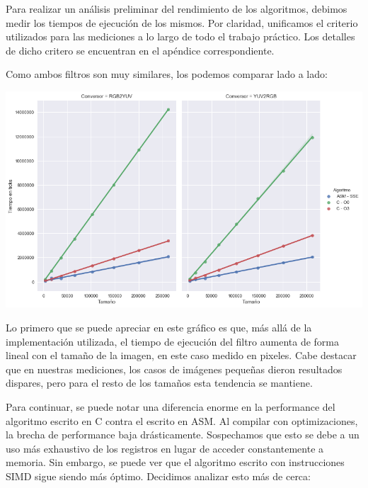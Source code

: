 Para realizar un análisis preliminar del rendimiento de los algoritmos, debimos medir los tiempos de ejecución de los mismos. Por claridad, unificamos el criterio utilizados para las mediciones a lo largo de todo el trabajo práctico. Los detalles de dicho critero se encuentran en el apéndice correspondiente.

Como ambos filtros son muy similares, los podemos comparar lado a lado:

\begin{center}
	\includegraphics[scale=0.5]{img/conversores_CvsASMvsO3.png}
\end{center}

Lo primero que se puede apreciar en este gráfico es que, más allá de la implementación utilizada, el tiempo de ejecución del filtro aumenta de forma lineal con el tamaño de la imagen, en este caso medido en pixeles. Cabe destacar que en nuestras mediciones, los casos de imágenes pequeñas dieron resultados dispares, pero para el resto de los tamaños esta tendencia se mantiene.

Para continuar, se puede notar una diferencia enorme en la performance del algoritmo escrito en C contra el escrito en ASM. Al compilar con optimizaciones, la brecha de performance baja drásticamente. Sospechamos que esto se debe a un uso más exhaustivo de los registros en lugar de acceder constantemente a memoria. Sin embargo, se puede ver que el algoritmo escrito con instrucciones SIMD sigue siendo más óptimo. Decidimos analizar esto más de cerca:


